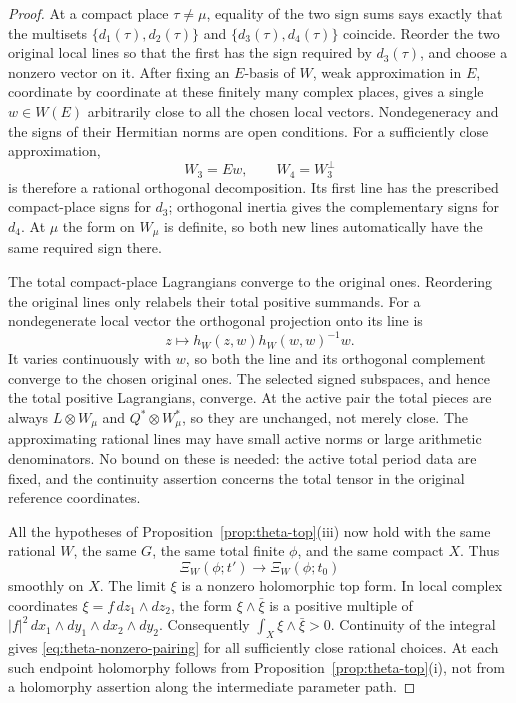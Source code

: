 \begin{proof}
At a compact place \(\tau\ne\mu\), equality of the two sign
sums says exactly that the multisets
\(\{d_1(\tau),d_2(\tau)\}\) and
\(\{d_3(\tau),d_4(\tau)\}\) coincide.  Reorder the two
original local lines so that the first has the sign required
by \(d_3(\tau)\), and choose a nonzero vector on it.
After fixing an \(E\)-basis of \(W\), weak approximation in
\(E\), coordinate by coordinate at these finitely many
complex places, gives a single \(w\in W(E)\) arbitrarily
close to all the chosen local vectors.  Nondegeneracy and
the signs of their Hermitian norms are open conditions.
For a sufficiently close approximation,
\[
 W_3=Ew,\qquad W_4=W_3^\perp
\]
is therefore a rational orthogonal decomposition.  Its first
line has the prescribed compact-place signs for \(d_3\);
orthogonal inertia gives the complementary signs for \(d_4\).
At \(\mu\) the form on \(W_\mu\) is definite, so both new
lines automatically have the same required sign there.

The total compact-place Lagrangians converge to the original
ones.  Reordering the original lines only relabels their total
positive summands.  For a nondegenerate local vector the
orthogonal projection onto its line is
\[
 z\longmapsto h_W(z,w)h_W(w,w)^{-1}w.
\]
It varies continuously with \(w\), so both the line and its
orthogonal complement converge to the chosen original ones.
The selected signed subspaces, and hence the total positive
Lagrangians, converge.  At the active pair the total pieces
are always \(L\otimes W_\mu\) and \(Q^*\otimes W_\mu^*\),
so they are unchanged, not merely close.  The approximating
rational lines may have small active norms or large arithmetic
denominators.  No bound on these is needed: the active total
period data are fixed, and the continuity assertion concerns
the total tensor in the original reference coordinates.

All the hypotheses of Proposition~\ref{prop:theta-top}(iii)
now hold with the same rational \(W\), the same \(G\), the
same total finite \(\phi\), and the same compact \(X\).
Thus
\[
 \Xi_W(\phi;t')\longrightarrow \Xi_W(\phi;t_0)
\]
smoothly on \(X\).  The limit \(\xi\) is a nonzero
holomorphic top form.  In local complex coordinates
\(\xi=f\,dz_1\wedge dz_2\), the form
\(\xi\wedge\bar\xi\) is a positive multiple of
\(|f|^2\,dx_1\wedge dy_1\wedge dx_2\wedge dy_2\).
Consequently
\(\int_X\xi\wedge\bar\xi>0\).  Continuity of the integral
gives \eqref{eq:theta-nonzero-pairing} for all sufficiently
close rational choices.  At each such endpoint holomorphy
follows from Proposition~\ref{prop:theta-top}(i), not from a
holomorphy assertion along the intermediate parameter path.


\end{proof}
